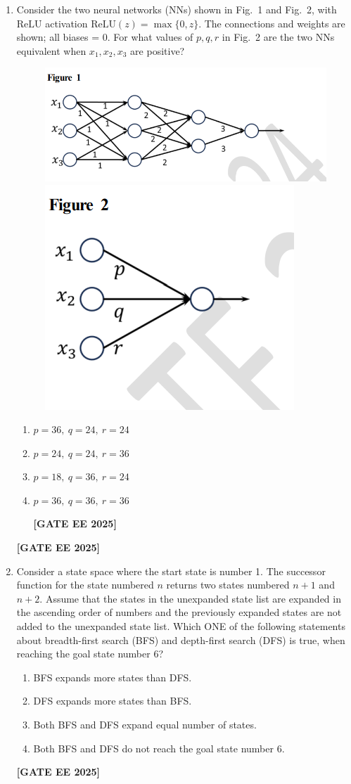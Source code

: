 \documentclass[journal]{IEEEtran}
\newcommand{\qfooter}{%
  \begin{flushright}\footnotesize\textbf{[GATE EE 2025]}\end{flushright}\vspace{1em}%
}
\begin{document}
\begin{enumerate}[leftmargin=*,label=\arabic*.]
\begin{enumerate}
\qfooter
\end{enumerate} \qfooter
\item Consider the two neural networks (NNs) shown in Fig.~1 and Fig.~2, with $\mathrm{ReLU}$ activation $\mathrm{ReLU}(z) = \max\{0, z\}$. The connections and weights are shown; all biases = 0. For what values of $p, q, r$ in Fig.~2 are the two NNs equivalent when $x_1,x_2,x_3$ are positive?

\begin{figure}[h]
    \centering
    \includegraphics[width=0.45\columnwidth]{figs/q43a.png}
    \includegraphics[width=0.45\columnwidth]{figs/q43b.png}
\end{figure}

\begin{enumerate}
\item $p = 36,\ q = 24,\ r = 24$
\item $p = 24,\ q = 24,\ r = 36$
\item $p = 18,\ q = 36,\ r = 24$
\item $p = 36,\ q = 36,\ r = 36$
\qfooter
\end{enumerate} \qfooter

\item Consider a state space where the start state is number 1. The successor function for the state numbered $n$ returns two states numbered $n+1$ and $n+2$. Assume that the states in the unexpanded state list are expanded in the ascending order of numbers and the previously expanded states are not added to the unexpanded state list. Which ONE of the following statements about breadth-first search (BFS) and depth-first search (DFS) is true, when reaching the goal state number 6?
\begin{multicols}{2}
\begin{enumerate}[label=(\Alph*)]
\item BFS expands more states than DFS.
\item DFS expands more states than BFS.
\item Both BFS and DFS expand equal number of states.
\item Both BFS and DFS do not reach the goal state number 6.
\end{enumerate} \qfooter
\end{multicols}


\end{enumerate}
\end{document}
